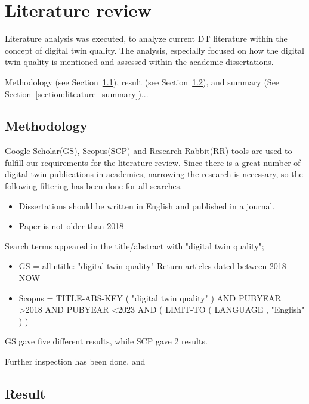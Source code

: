 \documentclass[9pt,conference]{IEEEtran}
\begin{document}
    \section{Literature review}
    \label{section:literature}
    Literature analysis was executed, to analyze current DT literature within the concept of digital twin quality. The analysis, especially focused on 
    how the digital twin quality is mentioned and assessed within the academic dissertations.

    Methodology (see Section~\ref{section:liteature_methodology}), result (see Section~\ref{section:liteature_result}), and summary (See Section~\ref{section:liteature_summary})...
    \subsection{Methodology}
    \label{section:liteature_methodology}

    Google Scholar(GS), Scopus(SCP) and Research Rabbit(RR) tools are used to fulfill our requirements for the literature review. 
    Since there is a great number of digital twin publications in academics, narrowing the research is necessary, so the following filtering has been done for all searches.
    \begin{itemize}
        \item Dissertations should be written in English and published in a journal.
        \item Paper is not older than 2018
    \end{itemize}
    
    Search terms appeared in the title/abstract with "digital twin quality";
    \begin{itemize}
        \item GS = allintitle: "digital twin quality" Return articles dated between 2018 - NOW  
        \item Scopus = TITLE-ABS-KEY ( "digital twin quality" )  AND  PUBYEAR  \textgreater  2018  AND  PUBYEAR  \textless  2023  AND  ( LIMIT-TO ( LANGUAGE ,  "English" ) ) 
    \end{itemize}

    GS gave five different results, while SCP gave 2 results.
    
    Further inspection has been done, and 
   


    \subsection{Result}
    \label{section:liteature_result}
\end{document}

